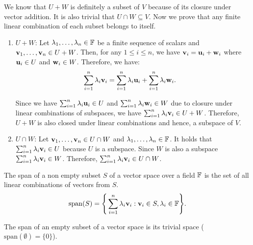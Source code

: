 \begin{proof*}
	We know that $U+W$ is definitely a subset of $V$ because of its closure under vector addition. It is also trivial that $U\cap W\subseteq V$. Now we prove that any finite linear combination of each subset belongs to itself.
	\begin{enumerate}
		\item $U+W$: Let $\lambda_1, \dots, \lambda_n \in \mathbb{F}$ be a finite sequence of scalars and ${\bf v}_1, \dots, {\bf v}_n\in U+W$. Then, for any $1\le i \le n$, we have ${\bf v}_i = {\bf u}_i + {\bf w}_i$ where ${\bf u}_i\in U$ and ${\bf w}_i \in W$. Therefore, we have:
		\begin{align*}
			\sum_{i=1}^n \lambda_i {\bf v}_i &= \sum_{i=1}^n \lambda_i {\bf u}_i + \sum_{i=1}^n \lambda_i {\bf w}_i.
		\end{align*} 

		\noindent Since we have $\sum_{i=1}^n \lambda_i {\bf u}_i\in U$ and $\sum_{i=1}^n \lambda_i {\bf w}_i \in W$ due to closure under linear combinations of subspaces, we have $\sum_{i=1}^n \lambda_i {\bf v}_i \in U+W$. Therefore, $U+W$ is also closed under linear combinations and hence, a subspace of $V$.

		\item $U\cap W$: Let ${\bf v}_1, \dots, {\bf v}_n \in U\cap W$ and $\lambda_1, \dots, \lambda_n\in\mathbb{F}$. It holds that $\sum_{i=1}^n\lambda_i{\bf v}_i \in U$ because $U$ is a subspace. Since $W$ is also a subspace $\sum_{i=1}^n \lambda_i{\bf v}_i \in W$. Therefore, $\sum_{i=1}^n\lambda_i{\bf v}_i\in U\cap W$. 
	\end{enumerate} 
\end{proof*} 

\begin{definition}
	The span of a non empty subset $S$ of a vector space over a field $\mathbb{F}$ is the set of all linear combinations of vectors from $S$.
	\begin{equation}
		\mathrm{span}(S) = \Bigg\{ 
			\sum_{i=1}^n \lambda_i {\bf v}_i : {\bf v}_i \in S, \lambda_i \in \mathbb{F}
		 \Bigg\}.
	\end{equation} 

	\noindent The span of an empty subset of a vector space is its trivial space ($\mathrm{span}(\emptyset) = \{0\}$).
\end{definition} 